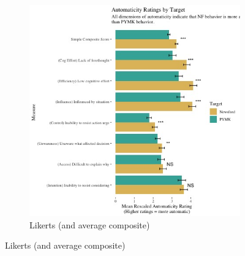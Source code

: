 \documentclass[12pt,letterpaper]{article}
\begin{document}
\begin{figure}
\begin{subfigure}{.5\textwidth}
        \includegraphics[width=1\linewidth, trim={0cm 0 3cm 2cm}, clip]{Output/Graphs/Experiments/Automaticity/composite score and components.jpg}  
        \caption{Likerts (and average composite)}
        \label{fig:auto_likerts}
        

\end{subfigure}
\end{figure}
\end{document}

